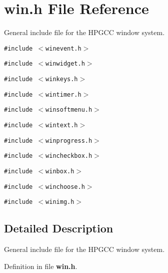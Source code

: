 \section{win.h File Reference}
\label{win_8h}
General include file for the HPGCC window system. 

{\tt \#include $<$winevent.h$>$}\par
{\tt \#include $<$winwidget.h$>$}\par
{\tt \#include $<$winkeys.h$>$}\par
{\tt \#include $<$wintimer.h$>$}\par
{\tt \#include $<$winsoftmenu.h$>$}\par
{\tt \#include $<$wintext.h$>$}\par
{\tt \#include $<$winprogress.h$>$}\par
{\tt \#include $<$wincheckbox.h$>$}\par
{\tt \#include $<$winbox.h$>$}\par
{\tt \#include $<$winchoose.h$>$}\par
{\tt \#include $<$winimg.h$>$}\par


\subsection{Detailed Description}
General include file for the HPGCC window system. 



Definition in file {\bf win.h}.